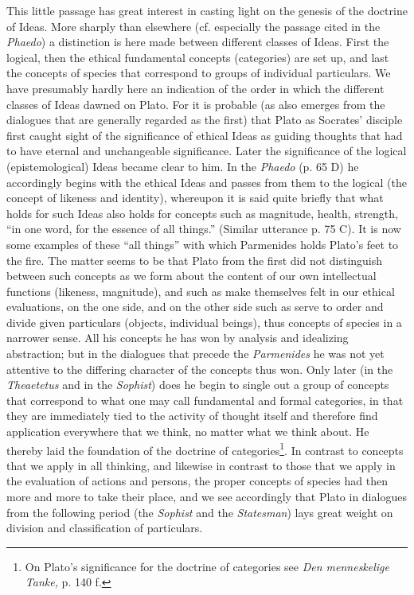 \documentclass[12pt,a4paper,openany]{book}
\newcommand{\opage}[1]{\marginnote{\footnotesize\textit{[#1]}}}
\begin{document}
This little passage has great interest in casting light
on the genesis of the doctrine of Ideas. More sharply than elsewhere (cf.
especially the passage cited in the \textit{Phaedo}) a distinction is here made between
different classes of Ideas. First the logical, then
the ethical fundamental concepts (categories) are set up, and last the
concepts of species that correspond to groups of individual particulars. We have
presumably hardly here an indication of the order in which the
different classes of Ideas dawned on Plato. For it
is probable (as also emerges from the dialogues
that are generally regarded as the first) that Plato
as Socrates’ disciple first caught sight of the significance of ethical Ideas
as guiding thoughts that had to have eternal and
unchangeable significance. Later the significance of the logical (epistemological)
Ideas became clear to him. In the \textit{Phaedo}
(p. 65 D) he accordingly begins with the ethical Ideas and
passes from them to the logical (the concept of likeness and identity),
whereupon it is said quite briefly that what holds
for such Ideas also holds for concepts such as magnitude,
health, strength, ``in one word, for the essence of all things.''
(Similar utterance p. 75 C). It is now some examples of
these ``all things'' with which Parmenides holds Plato’s feet to the fire.
The matter seems to be that Plato from the first did not
distinguish between such concepts as we form about the content
of our own intellectual functions (likeness, magnitude),
and such as make themselves felt in our ethical
evaluations, on the one side, and on the other side
such as serve to order and divide given
particulars (objects, individual beings), thus
\setcounter{footnote}{0}%
\opage{10}concepts of species in a narrower sense. All his concepts he has won
by analysis and idealizing abstraction; but in the
dialogues that precede the \textit{Parmenides} he was not yet
attentive to the differing character of the concepts thus
won. Only later (in the \textit{Theaetetus} and in the
\textit{Sophist}) does he begin to single out a group of concepts
that correspond to what one may call fundamental and
formal categories, in that they are immediately tied to
the activity of thought itself and therefore find application everywhere
that we think, no matter what we think about.
He thereby laid the foundation of the doctrine of categories\footnote[1]{On Plato’s significance for the doctrine of categories see \textit{Den menneskelige Tanke,} p. 140 f.}. In contrast
to concepts that we apply in all thinking, and likewise
in contrast to those that we apply in the evaluation of actions
and persons, the proper concepts of species had then more and more to take their place, and we see accordingly that Plato in
dialogues from the following period (the \textit{Sophist} and the \textit{Statesman})
lays great weight on division and classification
of particulars.
\end{document}
